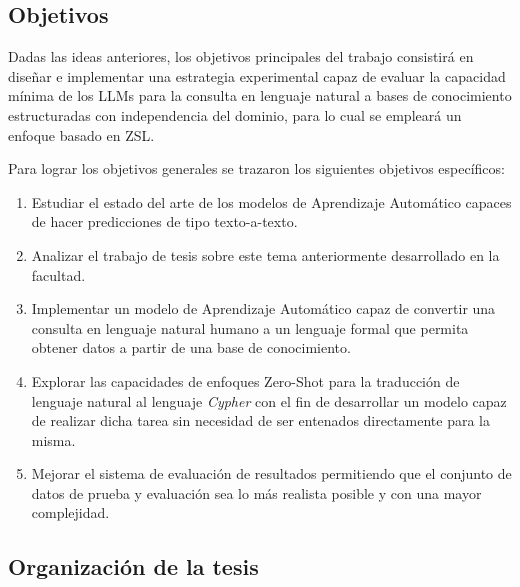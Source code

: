 \subsection*{Objetivos}
Dadas las ideas anteriores, los objetivos principales del trabajo consistirá en diseñar e implementar una estrategia experimental capaz de evaluar la capacidad mínima de los LLMs para la consulta en lenguaje natural a bases de conocimiento estructuradas con independencia del dominio, para lo cual se empleará un enfoque basado en ZSL.

Para lograr los objetivos generales se trazaron los siguientes objetivos específicos:

\begin{enumerate}
	\item Estudiar el estado del arte de los modelos de Aprendizaje Automático capaces de hacer predicciones de tipo texto-a-texto.
	\item Analizar el trabajo de tesis sobre este tema anteriormente desarrollado en la facultad.
	\item Implementar un modelo de Aprendizaje Automático capaz de convertir una consulta en lenguaje natural humano a un lenguaje formal que permita obtener datos a partir de una 		base de conocimiento.
	\item Explorar las capacidades de enfoques Zero-Shot para la traducción de lenguaje natural al lenguaje \textit{Cypher} con el fin de desarrollar un modelo capaz de realizar dicha tarea sin necesidad de ser entenados directamente para la misma.
	\item Mejorar el sistema de evaluación de resultados permitiendo que el conjunto de datos de prueba y evaluación sea lo más realista posible y con una mayor complejidad.
\end{enumerate}

\subsection*{Organización de la tesis}

